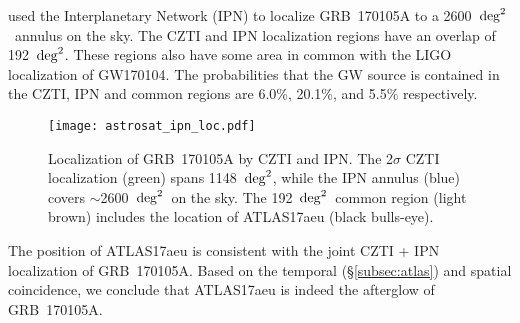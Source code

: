 \documentclass[twocolumn]{aastex6}
\newcommand{\sqd}{\ensuremath{{\rm deg}^2}}
\begin{document}
\citet{GW170104_IPN} used the Interplanetary Network (IPN) to localize GRB~170105A to a 2600~\sqd\ annulus on the sky. The CZTI and IPN localization regions have an overlap of 192~\sqd. These regions also have some area in common with the LIGO localization of GW170104. The probabilities that the GW source is contained in the CZTI, IPN and common regions are 6.0\%, 20.1\%, and 5.5\% respectively.


\begin{figure}[!tbh]
\texttt{[image: astrosat\_ipn\_loc.pdf]}
\caption{Localization of GRB~170105A by CZTI and IPN. The 2$\sigma$ CZTI localization (green) spans 1148~\sqd, while the IPN annulus (blue) covers $\sim$2600~\sqd\ on the sky. The 192~\sqd\ common region (light brown) includes the location of ATLAS17aeu (black bulls-eye). 
}
\label{fig:loc}
\end{figure}

The position of ATLAS17aeu is consistent with the joint CZTI + IPN localization of GRB~170105A. Based on the temporal (\S\ref{subsec:atlas}) and spatial coincidence, we conclude that ATLAS17aeu is indeed the afterglow of GRB~170105A.
\end{document}
